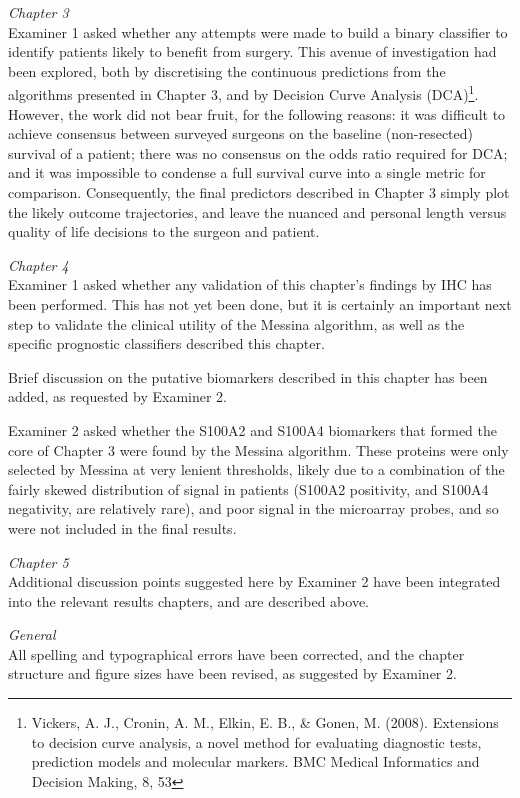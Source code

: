 \documentclass[a4paper,12pt,stdletter,sigleft]{newlfm}
\begin{document}
\begin{newlfm}
\emph{Chapter 3} \\
Examiner 1 asked whether any attempts were made to build a binary classifier to identify patients likely to benefit from surgery.  This avenue of investigation had been explored, both by discretising the continuous predictions from the algorithms presented in Chapter 3, and by Decision Curve Analysis (DCA)\footnote{Vickers, A. J., Cronin, A. M., Elkin, E. B., \& Gonen, M. (2008). Extensions to decision curve analysis, a novel method for evaluating diagnostic tests, prediction models and molecular markers. BMC Medical Informatics and Decision Making, 8, 53}.  However, the work did not bear fruit, for the following reasons: it was difficult to achieve consensus between surveyed surgeons on the baseline (non-resected) survival of a patient; there was no consensus on the odds ratio required for DCA; and it was impossible to condense a full survival curve into a single metric for comparison.  Consequently, the final predictors described in Chapter 3 simply plot the likely outcome trajectories, and leave the nuanced and personal length versus quality of life decisions to the surgeon and patient.

\emph{Chapter 4} \\
Examiner 1 asked whether any validation of this chapter's findings by IHC has been performed.  This has not yet been done, but it is certainly an important next step to validate the clinical utility of the Messina algorithm, as well as the specific prognostic classifiers described this chapter.

Brief discussion on the putative biomarkers described in this chapter has been added, as requested by Examiner 2.

Examiner 2 asked whether the S100A2 and S100A4 biomarkers that formed the core of Chapter 3 were found by the Messina algorithm.  These proteins were only selected by Messina at very lenient thresholds, likely due to a combination of the fairly skewed distribution of signal in patients (S100A2 positivity, and S100A4 negativity, are relatively rare), and poor signal in the microarray probes, and so were not included in the final results.

\emph{Chapter 5} \\
Additional discussion points suggested here by Examiner 2 have been integrated into the relevant results chapters, and are described above.

\emph{General} \\
All spelling and typographical errors have been corrected, and the chapter structure and figure sizes have been revised, as suggested by Examiner 2.


\end{newlfm}
\end{document}
